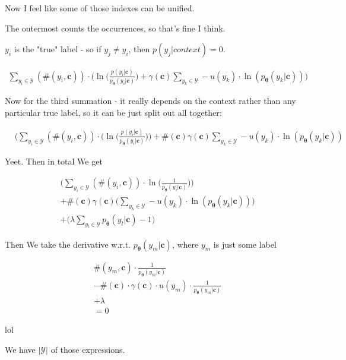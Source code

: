 \documentclass{article}
\newcommand{\vtheta}{\boldsymbol{\theta}}
\newcommand{\model}{p_{\vtheta}}
\newcommand{\context}{\boldsymbol{c}}
\begin{document}
		Now I feel like some of those indexes can be unified.
		
		The outermost counts the occurrences, so that's fine I think.
		
		$y_i$ is the "true" label - so if $y_j\neq y_i$, then $p(y_j|context) = 0$. 
		
		\begin{align}
			\sum_{y_i\in\mathcal{Y}} (\#(y_i, \context))\cdot \bigg(  \ln\bigg(\frac{p(y_i|\context)}{\model(y_i|\context)} \bigg) + \gamma(\context)\sum_{y_k\in\mathcal{Y}} - u(y_k)\cdot\ln(\model(y_k|\context)) \bigg)
		\end{align}		
			
		Now for the third summation - it really depends on the context rather than any particular true label, so it can be just split out all together:
		
		\begin{align}
			&\bigg(\sum_{y_i\in\mathcal{Y}} (\#(y_i, \context))\cdot \bigg( \ln\bigg(\frac{p(y_i|\context)}{\model(y_i|\context)} \bigg)\bigg) + \#(\context)\gamma(\context)\sum_{y_k\in\mathcal{Y}} - u(y_k)\cdot\ln(\model(y_k|\context)) 
		\end{align}	
		
		Yeet. Then in total We get 
		
		\begin{align}
			&\bigg(\sum_{y_i\in\mathcal{Y}} (\#(y_i, \context))\cdot  \ln\bigg(\frac{1}{\model(y_i|\context)} 	\bigg)\bigg) \\
			&+ \#(\context)\gamma(\context)\bigg(\sum_{y_k\in\mathcal{Y}} - u(y_k)\cdot\ln(\model(y_k|\context))\bigg) \\
			&+ \bigg(\lambda\sum_{y_l\in\mathcal{Y}} \model(y_l|\context) -1\bigg) 
		\end{align}	
		
		Then We take the derivative w.r.t. $\model(y_m|\context)$, where $y_m$ is just some label
		
		\begin{align}
			&\#(y_m, \context)\cdot  \frac{1}{\model(y_m|\context)} 	 \\
			&- \#(\context)\cdot \gamma(\context)\cdot u(y_m)\cdot\frac{1}{\model(y_m|\context)} \\
			&+ \lambda \\
			&=0
		\end{align}	
		
		lol
		
		We have $|\mathcal{Y}|$ of those expressions. 
		
\end{document}
